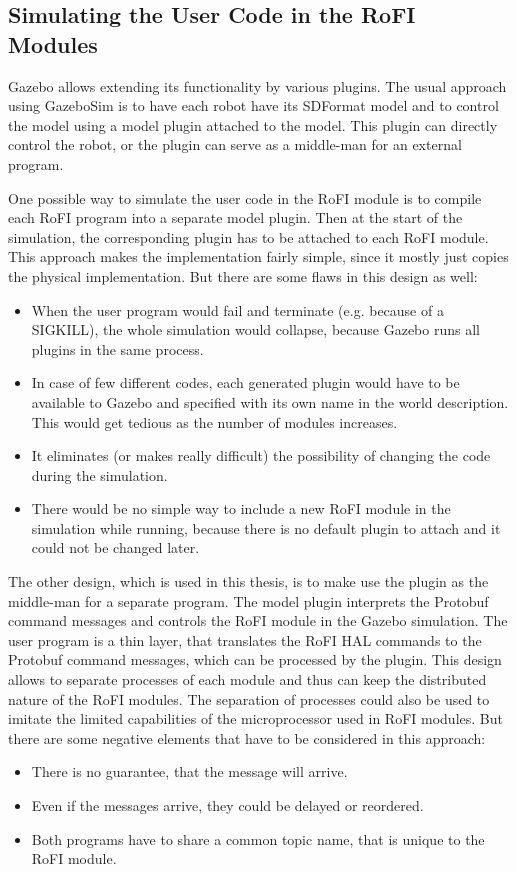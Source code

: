 \documentclass[
  digital, %
  table,   %
  oneside, %
  nolof,     %
  nolot,     %
]{fithesis3}
\begin{document}
\subsection{Simulating the User Code in the RoFI Modules}

Gazebo allows extending its functionality by various plugins.
The usual approach using GazeboSim is to have each robot have its SDFormat model and to control the model using a model plugin attached to the model.
This plugin can directly control the robot, or the plugin can serve as a middle-man for an external program.

One possible way to simulate the user code in the RoFI module is to compile each RoFI program into a separate model plugin.
Then at the start of the simulation, the corresponding plugin has to be attached to each RoFI module.
This approach makes the implementation fairly simple, since it mostly just copies the physical implementation.
But there are some flaws in this design as well:
\begin{itemize}
    \item When the user program would fail and terminate (e.g. because of a SIGKILL), the whole simulation would collapse, because Gazebo runs all plugins in the same process.
    \item In case of few different codes, each generated plugin would have to be available to Gazebo and specified with its own name in the world description.
    This would get tedious as the number of modules increases.
    \item It eliminates (or makes really difficult) the possibility of changing the code during the simulation.
    \item There would be no simple way to include a new RoFI module in the simulation while running, because there is no default plugin to attach and it could not be changed later.
\end{itemize}

The other design, which is used in this thesis, is to make use the plugin as the middle-man for a separate program.
The model plugin interprets the Protobuf command messages and controls the RoFI module in the Gazebo simulation.
The user program\label{user-program} is a thin layer, that translates the RoFI HAL commands to the Protobuf command messages, which can be processed by the plugin.
This design allows to separate processes of each module and thus can keep the distributed nature of the RoFI modules.
The separation of processes could also be used to imitate the limited capabilities of the microprocessor used in RoFI modules.
But there are some negative elements that have to be considered in this approach:
\begin{itemize}
    \item There is no guarantee, that the message will arrive.
    \item Even if the messages arrive, they could be delayed or reordered.
    \item Both programs have to share a common topic name, that is unique to the RoFI module.
\end{itemize}
\end{document}
